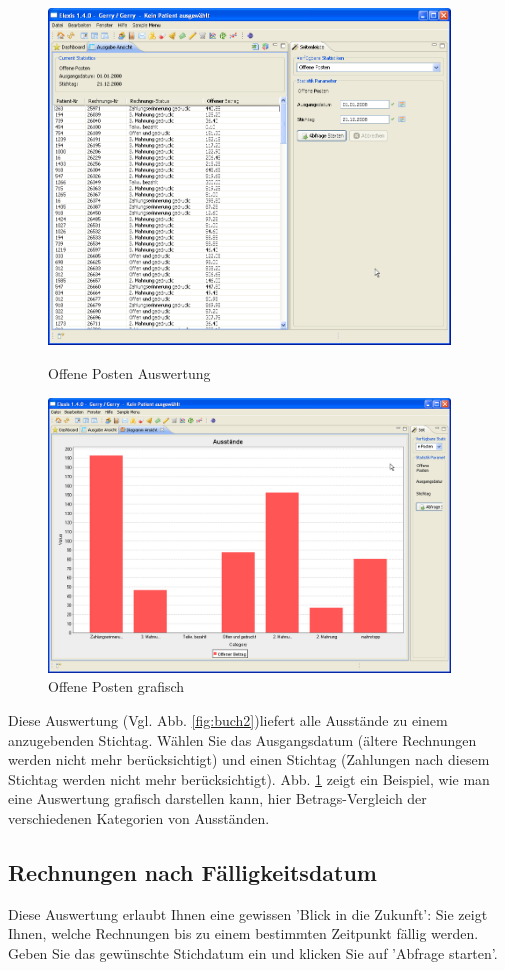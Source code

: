 \documentclass[a4paper]{scrartcl}
\begin{document}
\begin{figure}[htbp]
    \begin{minipage}{0.5\textwidth}
      \centering
       \includegraphics[width=0.95\textwidth]{buch2}
         \caption{Offene Posten Auswertung}\label{fig:buch2}
     \end{minipage}\hfill
     \begin{minipage}{0.5\textwidth}
      \centering
       \includegraphics[width=0.95\textwidth]{buch3}
       \caption{Offene Posten grafisch}\label{fig:buch3}
    \end{minipage}
\end{figure}


Diese Auswertung (Vgl. Abb. \ref{fig:buch2})liefert alle Ausstände zu einem anzugebenden Stichtag. Wählen Sie das Ausgangsdatum (ältere Rechnungen werden nicht mehr berücksichtigt) und einen Stichtag (Zahlungen nach diesem Stichtag werden nicht mehr berücksichtigt). Abb. \ref{fig:buch3} zeigt ein Beispiel, wie man eine Auswertung grafisch darstellen kann, hier Betrags-Vergleich der verschiedenen Kategorien von Ausständen.

\subsection{Rechnungen nach Fälligkeitsdatum}
Diese Auswertung erlaubt Ihnen eine gewissen 'Blick in die Zukunft': Sie zeigt Ihnen, welche Rechnungen bis zu einem bestimmten Zeitpunkt fällig werden.
Geben Sie das gewünschte Stichdatum ein und klicken Sie auf 'Abfrage starten'.
\end{document}
